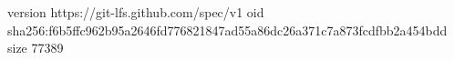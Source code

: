 version https://git-lfs.github.com/spec/v1
oid sha256:f6b5ffc962b95a2646fd776821847ad55a86dc26a371c7a873fcdfbb2a454bdd
size 77389
